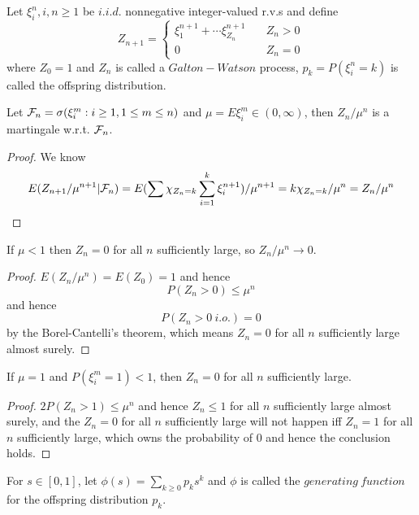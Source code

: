 \begin{definition}
    Let $\xi_i^n, i,n\geq 1$ be $i.i.d.$ nonnegative integer-valued r.v.s and define
    \[
    Z_{n+1} = \begin{cases}
    \xi_1^{n+1}+\cdots\xi_{Z_n}^{n+1}\quad&Z_n>0 \\
    0&Z_n=0
    \end{cases}
    \]
    where $Z_0 = 1$ and $Z_n$ is called a $Galton-Watson$ process, $p_k = P(\xi_i^n = k)$ is called the offspring distribution.
\end{definition}

\begin{lemma}
    Let $\mathcal{F}_n = \sigma(\xi_i^m:i\geq 1, 1\leq m \leq n)$ and $\mu = E\xi_i^m \in (0,\infty)$, then $Z_n/\mu^n$ is a martingale w.r.t. $\mathcal{F}_n$.
\end{lemma}
\begin{proof}
    We know
    \[
    E(Z_{n+1}/\mu^{n+1}|\mathcal{F}_n) = E(\sum\chi_{Z_n = k}\sum\limits_{i=1}^k \xi_i^{n+1})/\mu^{n+1} = k\chi_{Z_n = k}/\mu^n = Z_n/\mu^n
    \]
\end{proof}

\begin{theorem}
    If $\mu<1$ then $Z_n = 0$ for all $n$ sufficiently large, so $Z_n/\mu^n \to 0$.
\end{theorem}
\begin{proof}\par
    $E(Z_n/\mu^n) = E(Z_0) = 1$ and hence
    \[
    P(Z_n > 0) \leq \mu^n
    \]
    and hence
    \[P(Z_n > 0\ i.o.) = 0\]
    by the Borel-Cantelli's theorem, which means $Z_n = 0$ for all $n$ sufficiently large almost surely.
\end{proof}

\begin{theorem}
    If $\mu=1$ and $P(\xi_i^m = 1)<1$, then $Z_n = 0$ for all $n$ sufficiently large.
\end{theorem}
\begin{proof}\par
    $2P(Z_n>1) \leq \mu^n$ and hence $Z_n \leq 1$ for all $n$ sufficiently large almost surely, and the $Z_n = 0$ for all $n$ sufficiently large will not happen iff $Z_n = 1$ for all $n$ sufficiently large, which owns the probability of $0$ and hence the conclusion holds.
\end{proof}

\begin{definition}
    For $s\in [0,1]$, let $\phi(s) = \sum_{k\geq 0} p_ks^k$ and $\phi$ is called the $generating\ function$ for the offspring distribution $p_k$.
\end{definition}

